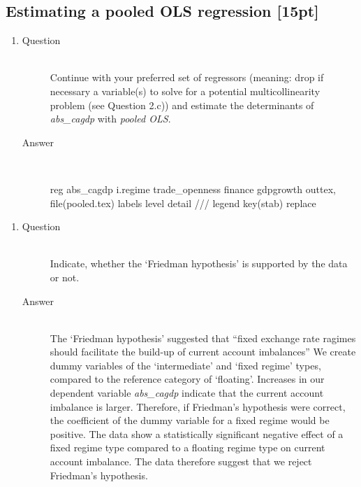 \documentclass{article}
\begin{document}
\subsection{Estimating a pooled OLS regression [15pt]}
  
  \begin{enumerate}[label=(\alph*)]
    \item 
    \begin{description}
      \item[Question] \hfill \\
      Continue with your preferred set of regressors (meaning: drop if necessary a variable(s) to solve for a potential multicollinearity problem (see Question 2.c)) and estimate the determinants of \textit{abs\_cagdp} with \textit{pooled OLS}.
      \item[Answer] \hfill \\
      \begin{CVerbatim}
reg abs_cagdp i.regime trade_openness finance gdpgrowth
outtex, file(pooled.tex) labels level detail ///
  legend key(stab) replace
      \end{CVerbatim}
      
    \end{description}
  \end{enumerate}
  
  \begin{enumerate}[label=(\alph*)]
    \item 
    \begin{description}
      \item[Question] \hfill \\
      Indicate, whether the `Friedman hypothesis' is supported by the data or not.
      \item[Answer] \hfill \\
      The `Friedman hypothesis' suggested that ``fixed exchange rate ragimes should facilitate the build-up of current account imbalances''
      We create dummy variables of the `intermediate' and `fixed regime' types, compared to the reference category of `floating'. Increases in our dependent variable \textit{abs\_cagdp} indicate that the current account imbalance is larger. Therefore, if Friedman's hypothesis were correct, the coefficient of the  dummy variable for a fixed regime would be positive. 
      The data show a statistically significant negative effect of a fixed regime type compared to a floating regime type on current account imbalance. The data therefore suggest that we reject Friedman's hypothesis.
    \end{description}
  \end{enumerate}
  
\end{document}

